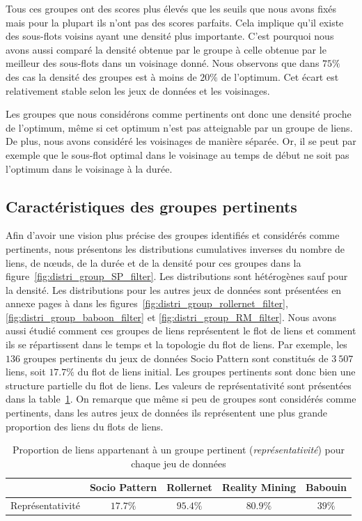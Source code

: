 Tous ces groupes ont des scores plus élevés que les seuils que nous avons fixés mais pour la plupart ils n'ont pas des scores parfaits.
Cela implique qu'il existe des sous-flots voisins ayant une densité plus importante.
C'est pourquoi nous avons aussi comparé la densité obtenue par le groupe à celle obtenue par le meilleur des sous-flots dans un voisinage donné.
Nous observons que dans $75\%$ des cas la densité des groupes est à moins de $20\%$ de l'optimum.
Cet écart est relativement stable selon les jeux de données et les voisinages.

Les groupes que nous considérons comme pertinents ont donc une densité proche de l'optimum, même si cet optimum n'est pas atteignable par un groupe de liens.
De plus, nous avons considéré les voisinages de manière séparée.
Or, il se peut par exemple que le sous-flot optimal dans le voisinage au temps de début ne soit pas l'optimum dans le voisinage à la durée.


\subsection{Caractéristiques des groupes pertinents}

Afin d'avoir une vision plus précise des groupes identifiés et considérés comme pertinents, nous présentons les distributions cumulatives inverses du nombre de liens, de n\oe{}uds, de la durée et de la densité pour ces groupes dans la figure~\ref{fig:distri_group_SP_filter}.
Les distributions sont hétérogènes sauf pour la densité.
Les distributions pour les autres jeux de données sont présentées en annexe pages \pageref{fig:distri_group_rollernet_filter} à \pageref{fig:distri_group_RM_filter} dans les figures~\ref{fig:distri_group_rollernet_filter},\ref{fig:distri_group_baboon_filter} et \ref{fig:distri_group_RM_filter}.
Nous avons aussi étudié comment ces groupes de liens représentent le flot de liens et comment ils se répartissent dans le temps et la topologie du flot de liens.
Par exemple, les $136$ groupes pertinents du jeux de données Socio Pattern sont constitués de $3\ 507$ liens, soit $17.7\%$ du flot de liens initial.
Les groupes pertinents sont donc bien une structure partielle du flot de liens.
Les valeurs de représentativité sont présentées dans la table~\ref{tab:res_representativite}.
On remarque que même si peu de groupes sont considérés comme pertinents, dans les autres jeux de données ils représentent une plus grande proportion des liens du flots de liens.


\begin{table}
\centering
\begin{tabular}{|c|c|c|c|c|}
\hline \rule[-1ex]{0pt}{3.5ex}
 & Socio Pattern & Rollernet & Reality Mining & Babouin \\
\hline
Représentativité & $17.7\%$ & $95.4\%$ & $80.9\%$ & $39\%$ \\

\hline
\end{tabular}
\caption{Proportion de liens appartenant à un groupe pertinent (\emph{représentativité}) pour chaque jeu de données}
\label{tab:res_representativite}       %
\end{table}


